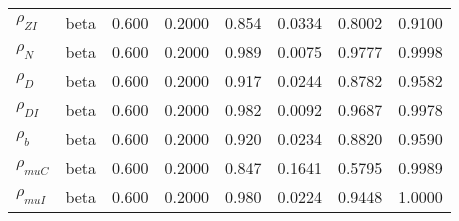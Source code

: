 \begin{center}
\begin{longtable}{llcccccc}
${\rho_{ZI}}$ & beta &   0.600 & 0.2000 &   0.854& 0.0334 &  0.8002 &  0.9100 \\ 
${\rho_N}$ & beta &   0.600 & 0.2000 &   0.989& 0.0075 &  0.9777 &  0.9998 \\ 
${\rho_D}$ & beta &   0.600 & 0.2000 &   0.917& 0.0244 &  0.8782 &  0.9582 \\ 
${\rho_{DI}}$ & beta &   0.600 & 0.2000 &   0.982& 0.0092 &  0.9687 &  0.9978 \\ 
${\rho_b}$ & beta &   0.600 & 0.2000 &   0.920& 0.0234 &  0.8820 &  0.9590 \\ 
${\rho_{muC}}$ & beta &   0.600 & 0.2000 &   0.847& 0.1641 &  0.5795 &  0.9989 \\ 
${\rho_{muI}}$ & beta &   0.600 & 0.2000 &   0.980& 0.0224 &  0.9448 &  1.0000 \\ 
\end{longtable}
 \end{center}
